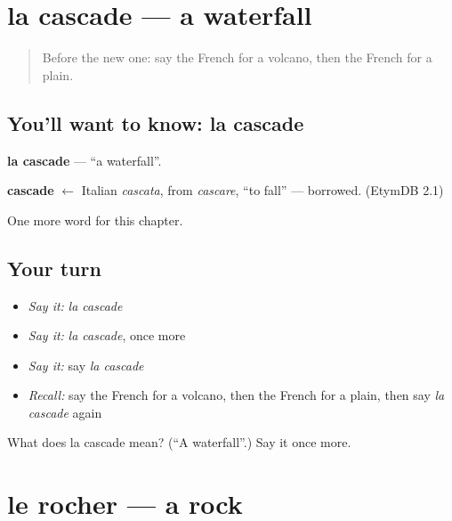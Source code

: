 \section[la cascade]{la cascade — a waterfall}

\label{lesson:FR-C171-cascade}



\begin{quote}
Before the new one: say the French for a volcano, then the French for a plain.
\end{quote}

\subsection*{You'll want to know: la cascade}
\textbf{la cascade} — \textquotedblleft{}a waterfall\textquotedblright{}.

\begin{cousinweb}
\textbf{cascade} $\leftarrow$ Italian \emph{cascata}, from \emph{cascare}, \textquotedblleft{}to fall\textquotedblright{} — borrowed. (EtymDB 2.1)
\end{cousinweb}

\begin{grammarlens}[title={What you've built}]
One more word for this chapter.
\end{grammarlens}

\subsection*{Your turn}
\begin{itemize}
\raggedright
  \item \emph{Say it:} \emph{la cascade}
  \item \emph{Say it:} \emph{la cascade}, once more
  \item \emph{Say it:} say \emph{la cascade}
  \item \emph{Recall:} say the French for a volcano, then the French for a plain, then say \emph{la cascade} again
\end{itemize}

\begin{tcolorbox}[breakable,colback=teal!4,colframe=teal!35!black,title={Before you move on}]
What does la cascade mean? (\textquotedblleft{}A waterfall\textquotedblright{}.) Say it once more.
\end{tcolorbox}
\section[le rocher]{le rocher — a rock}

